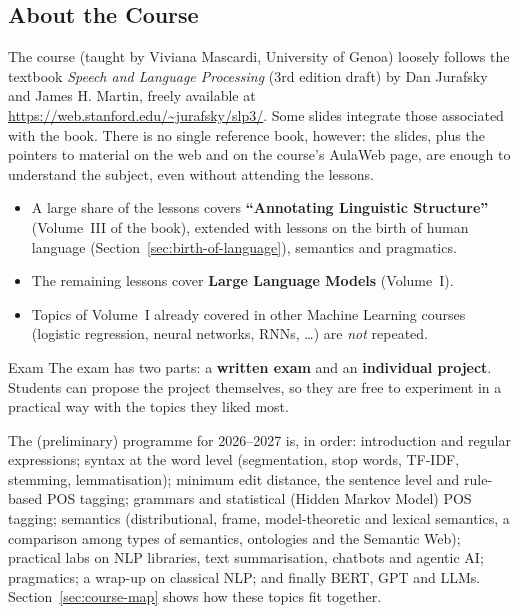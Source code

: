 \subsection{About the Course}
\label{sec:about-the-course}

The course (taught by Viviana Mascardi, University of Genoa) loosely follows the textbook
\emph{Speech and Language Processing} (3rd edition draft) by Dan Jurafsky and James H.
Martin, freely available at \url{https://web.stanford.edu/~jurafsky/slp3/}. Some slides
integrate those associated with the book. There is no single reference book, however:
the slides, plus the pointers to material on the web and on the course's AulaWeb page,
are enough to understand the subject, even without attending the lessons.

\begin{itemize}[nosep]
  \item A large share of the lessons covers \textbf{``Annotating Linguistic Structure''}
        (Volume~III of the book), extended with lessons on the birth of human language
        (Section~\ref{sec:birth-of-language}), semantics and pragmatics.
  \item The remaining lessons cover \textbf{Large Language Models} (Volume~I).
  \item Topics of Volume~I already covered in other Machine Learning courses (logistic
        regression, neural networks, RNNs, \ldots) are \emph{not} repeated.
\end{itemize}

\begin{nbfact}{Exam}
The exam has two parts: a \textbf{written exam} and an \textbf{individual project}.
Students can propose the project themselves, so they are free to experiment in a
practical way with the topics they liked most.
\end{nbfact}

The (preliminary) programme for 2026--2027 is, in order: introduction and regular
expressions; syntax at the word level (segmentation, stop words, TF-IDF, stemming,
lemmatisation); minimum edit distance, the sentence level and rule-based POS tagging;
grammars and statistical (Hidden Markov Model) POS tagging; semantics (distributional,
frame, model-theoretic and lexical semantics, a comparison among types of semantics,
ontologies and the Semantic Web); practical labs on NLP libraries, text summarisation,
chatbots and agentic AI; pragmatics; a wrap-up on classical NLP; and finally BERT, GPT
and LLMs. Section~\ref{sec:course-map} shows how these topics fit together.
